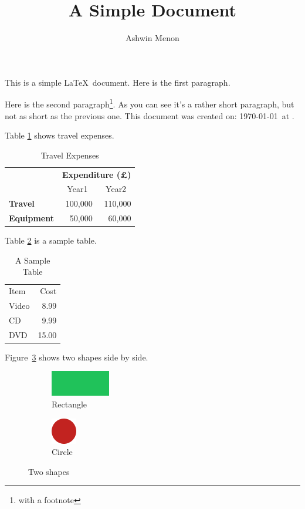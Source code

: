 \documentclass[12pt]{scrbook}
\title{A Simple Document}
\author{Ashwin Menon}
\begin{document}
\maketitle
\frontmatter
\listoftables

\mainmatter
This is a simple \LaTeX\ document. Here is the first paragraph.

Here is the second paragraph\footnote{with a footnote}. As you
can see it's a rather short paragraph, but not as short as the
previous one. This document was created on: \today\ at \currenttime.

Table \ref{tab:travel_expenses} shows travel expenses.
\begin{table}[htbp]
    \caption{Travel Expenses}
    \label{tab:travel_expenses}
    \centering
    \begin{tabular}{lrr}
                        & \multicolumn{2}{c}{\bfseries Expenditure (\pounds)} \\
                        & \multicolumn{1}{c}{Year1} & \multicolumn{1}{c}{Year2} \\
    \bfseries Travel    & 100,000 & 110,000 \\
    \bfseries Equipment & 50,000  & 60,000
    \end{tabular}
\end{table}

Table \ref{tab:sample_table} is a sample table.
\begin{table}[htbp]
    \caption{A Sample Table}
    \label{tab:sample_table}
    \centering
    \begin{tabular}{lr}
        Item  & Cost \\
        Video & 8.99 \\
        CD    & 9.99 \\
        DVD   & 15.00 \\
    \end{tabular}
\end{table}

Figure~\ref{fig:shapes} shows two shapes side by side.
\begin{figure}[htbp]
    \begin{subfigure}[b]{0.5\linewidth}
        \centering
        \includegraphics{rectangle}
        \caption{Rectangle}
        \label{fig:rectangle}
    \end{subfigure}%
%
    \begin{subfigure}[b]{0.5\linewidth}
        \centering
        \includegraphics{circle}
        \caption{Circle}
        \label{fig:circle}
    \end{subfigure}%
\caption{Two shapes}
\label{fig:shapes}
\end{figure}
\end{document}
